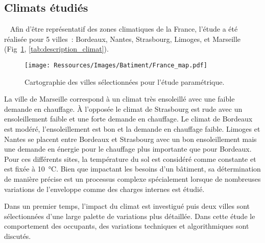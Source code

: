\subsection{Climats étudiés} %
\label{sub:climats_etudies}
~
Afin d’être représentatif des zones climatiques de la France, l’étude a été réalisée
pour 5 villes~: Bordeaux, Nantes, Strasbourg, Limoges, et Marseille (Fig~\ref{fig:carte_france},
\autoref{tab:description_climat}).
\begin{figure}
    \begin{center}
        \texttt{[image: Ressources/Images/Batiment/France\_map.pdf]}
    \end{center}
    \caption{Cartographie des villes sélectionnées pour l’étude paramétrique.
             \label{fig:carte_france}}
\end{figure}
La ville de Marseille correspond à un climat très ensoleillé avec une faible demande en
chauffage. À l’opposée le climat de Strasbourg est rude avec un ensoleillement faible et
une forte demande en chauffage. Le climat de Bordeaux est modéré, l’ensoleillement est bon
et la demande en chauffage faible. Limoges et Nantes se placent entre Bordeaux et
Strasbourg avec un bon ensoleillement mais une demande en énergie pour le chauffage plus
importante que pour Bordeaux. Pour ces différents sites, la température du sol est
considéré comme constante et est fixée à \SI{10}{\celsius}. Bien que impactant les besoins
d’un bâtiment, sa détermination de manière précise est un processus complexe spécialement
lorsque de nombreuses variations de l’enveloppe comme des charges internes est étudié.

Dans un premier temps, l’impact du climat est investigué puis deux villes sont
sélectionnées d’une large palette de variations plus détaillée. Dans cette
étude le comportement des occupants, des variations techniques et algorithmiques sont
discutés.

